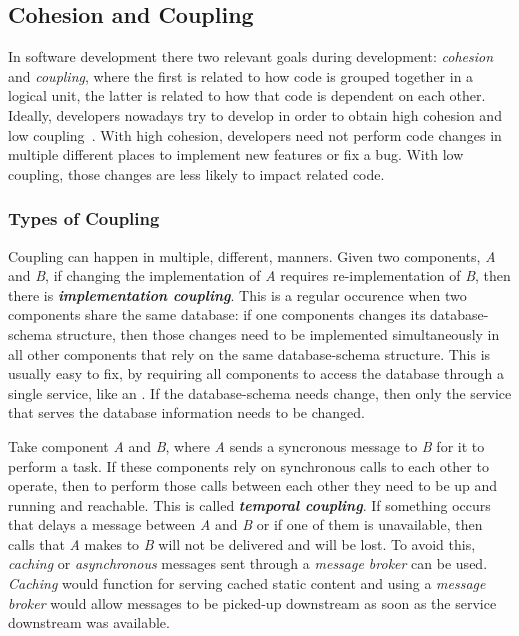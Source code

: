 \subsection{Cohesion and Coupling}\label{state-of-the-art:ss:cohesion-and-coupling}
In software development there two relevant goals during development: \textit{cohesion} and \textit{coupling}, where the first is related to how code is grouped together in a logical unit, the latter is related to how that code is dependent on each other. Ideally, developers nowadays try to develop in order to obtain high cohesion and low coupling~\Parencite{candela_bavota_russo_oliveto_2016}. With high cohesion, developers need not perform code changes in multiple different places to implement new features or fix a bug. With low coupling, those changes are less likely to impact related code.

\subsubsection{Types of Coupling}\label{state-of-the-art:ss:types-of-coupling}


Coupling can happen in multiple, different, manners. Given two components, \textit{A} and \textit{B}, if changing the implementation of \textit{A} requires re-implementation of \textit{B}, then there is \textbf{\textit{implementation coupling}}. This is a regular occurence when two components share the same database: if one components changes its database-schema structure, then those changes need to be implemented simultaneously in all other components that rely on the same database-schema structure. This is usually easy to fix, by requiring all components to access the database through a single service, like an . If the database-schema needs change, then only the service that serves the database information needs to be changed.

Take component \textit{A} and \textit{B}, where \textit{A} sends a syncronous message to \textit{B} for it to perform a task. If these components rely on synchronous calls to each other to operate, then to perform those calls between each other they need to be up and running and reachable. This is called \textbf{\textit{temporal coupling}}. If something occurs that delays a message between \textit{A} and \textit{B} or if one of them is unavailable, then calls that \textit{A} makes to \textit{B} will not be delivered and will be lost. To avoid this, \textit{caching} or \textit{asynchronous} messages sent through a \textit{message broker} can be used. \textit{Caching} would function for serving cached static content and using a \textit{message broker} would allow messages to be picked-up downstream as soon as the service downstream was available.




